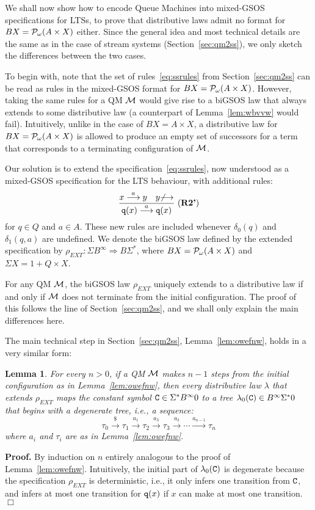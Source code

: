 \documentclass[adraft,copyright,creativecommons]{eptcs}
\newtheorem{lemma}[theorem]{Lemma}
\newenvironment{proof}[1][Proof]{\noindent\textbf{#1.} }{{\hfill $\Box$ \\}}
\newcommand{\To}{\Longrightarrow}
\newcommand{\Bb}{B^{\infty}}
\newcommand{\Ss}{\Sigma^*}
\renewcommand{\S}{\Sigma}
\newcommand{\goes}[1]{\stackrel{#1}{\longrightarrow}}
\newcommand{\Pf}{{\cal P}_{\omega}}
\begin{document}
We shall now show how to encode Queue Machines into mixed-GSOS specifications for LTSs, to prove that distributive laws admit no format for $BX=\Pf(A\times X)$ either. Since the general idea and most technical details are the same as in the case of stream systems (Section~\ref{sec:qm2ss}), we only sketch the differences between the two cases.

To begin with, note that the set of rules~\eqref{eq:ssrules} from Section~\ref{sec:qm2ss} can be read as rules in the mixed-GSOS format for $BX=\Pf(A\times X)$. However, taking the same rules for a QM ${\cal M}$ would give rise to a biGSOS law that always extends to some distributive law (a counterpart of Lemma~\ref{lem:wbvvw} would fail). Intuitively, unlike in the case of $BX=A\times X$, a distributive law for $BX=\Pf(A\times X)$ is allowed to produce an empty set of successors for a term that corresponds to a terminating configuration of ${\cal M}$.

Our solution is to extend the specification~\eqref{eq:ssrules}, now understood as a mixed-GSOS specification for the LTS behaviour, with additional rules:
\begin{equation}\label{eq:negrule}
\dfrac{x\goes{a}y\quad y{\not \goes{} }}{{\tt q}(x)\goes{a}{\tt q}(x)}\ (\textbf{R2'})
\end{equation}
for $q\in Q$ and $a\in A$. These new rules are included whenever $\delta_0(q)$ and $\delta_1(q,a)$ are undefined.
We denote the biGSOS law defined by the extended specification by $\rho_{EXT}:\S\Bb\To B\Ss$, where $BX=\Pf(A\times X)$ and $\S X = 1+Q\times X$.

For any QM $\cal M$, the biGSOS law $\rho_{EXT}$ uniquely extends to a distributive law if and only if $\cal M$ does not terminate from the initial configuration. The proof of this follows the line of Section~\ref{sec:qm2ss}, and we shall only explain the main differences here.

The main technical step in Section~\ref{sec:qm2ss}, Lemma~\ref{lem:owefnw}, holds in a very similar form:

\begin{lemma}\label{lem:osnvvsv}\rm
For every $n>0$, if a QM ${\cal M}$ makes $n-1$ steps from the initial configuration as in Lemma~\ref{lem:owefnw}, 
then every distributive law $\lambda$ that extends $\rho_{EXT}$ maps the constant symbol ${\tt C}\in \Ss\Bb0$ to a tree $\lambda_0({\tt C})\in\Bb\Ss0$ that begins with
a degenerate tree, i.e., a sequence:
\[
	\tau_0\goes{\$}\tau_1\goes{a_1}\tau_2\goes{a_3}\tau_3\goes{a_3}\cdots\goes{a_{n-1}}\tau_n
\]
where $a_i$ and $\tau_i$ are as in Lemma~\ref{lem:owefnw}.
\end{lemma}
\begin{proof}
By induction on $n$ entirely analogous to the proof of Lemma~\ref{lem:owefnw}. Intuitively, the initial part of $\lambda_0({\tt C})$ is degenerate because the specification $\rho_{EXT}$ is deterministic, i.e., it only infers one transition from ${\tt C}$, and infers at most one transition for ${\tt q}(x)$ if $x$ can make at most one transition.
\end{proof}
\end{document}
